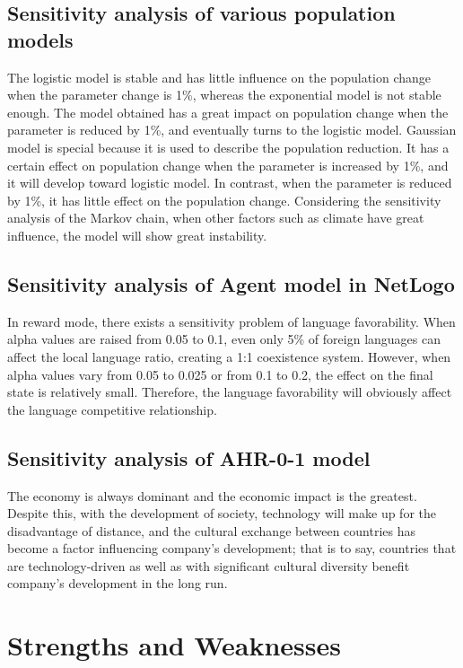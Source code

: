 \documentclass{mcmthesis}
\begin{document}
\subsection{Sensitivity analysis of various population models}
The logistic model is stable and has little influence on the population change when the parameter change is 1\%, whereas the exponential model is not stable enough. The model obtained has a great impact on population change when the parameter is reduced by 1\%, and eventually turns to the logistic model.  Gaussian model is special because it is used to describe the population reduction. It has a certain effect on population change when the parameter is increased by 1\%, and it will develop toward logistic model. In contrast, when the parameter is reduced by 1\%, it has little effect on the population change. Considering the sensitivity analysis of the Markov chain, when other factors such as climate have great influence, the model will show great instability.
\subsection{Sensitivity analysis of Agent model in NetLogo}
In reward mode, there exists a sensitivity problem of language favorability. When alpha values are raised from 0.05 to 0.1, even only 5\% of foreign languages can affect the local language ratio, creating a 1:1 coexistence system. However, when alpha values vary from 0.05 to 0.025 or from 0.1 to 0.2, the effect on the final state is relatively small. Therefore, the language favorability will obviously affect the language competitive relationship.
\subsection{Sensitivity analysis of AHR-0-1 model}
The economy is always dominant and the economic impact is the greatest. Despite this, with the development of society, technology will make up for the disadvantage of distance, and the cultural exchange between countries has become a factor influencing company's development; that is to say, countries that are  technology-driven as well as with significant cultural diversity benefit company's development in the long run.

\section{Strengths and Weaknesses}
\end{document}
